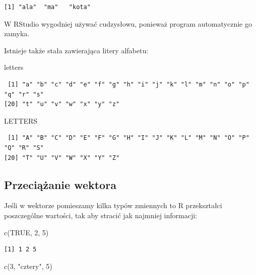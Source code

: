 \documentclass[
  letterpaper,
  DIV=11,
  numbers=noendperiod]{scrreprt}
\newenvironment{Shaded}{\begin{snugshade}}{\end{snugshade}}
\newcommand{\ConstantTok}[1]{\textcolor[rgb]{0.56,0.35,0.01}{#1}}
\newcommand{\DecValTok}[1]{\textcolor[rgb]{0.68,0.00,0.00}{#1}}
\newcommand{\FunctionTok}[1]{\textcolor[rgb]{0.28,0.35,0.67}{#1}}
\newcommand{\NormalTok}[1]{\textcolor[rgb]{0.00,0.23,0.31}{#1}}
\newcommand{\StringTok}[1]{\textcolor[rgb]{0.13,0.47,0.30}{#1}}
\begin{document}
\begin{verbatim}
[1] "ala"  "ma"   "kota"
\end{verbatim}

W RStudio wygodniej używać cudzysłowu, ponieważ program automatycznie go
zamyka.

Istnieje także stała zawierająca litery alfabetu:

\begin{Shaded}
\begin{Highlighting}[]
\NormalTok{letters}
\end{Highlighting}
\end{Shaded}

\begin{verbatim}
 [1] "a" "b" "c" "d" "e" "f" "g" "h" "i" "j" "k" "l" "m" "n" "o" "p" "q" "r" "s"
[20] "t" "u" "v" "w" "x" "y" "z"
\end{verbatim}

\begin{Shaded}
\begin{Highlighting}[]
\NormalTok{LETTERS}
\end{Highlighting}
\end{Shaded}

\begin{verbatim}
 [1] "A" "B" "C" "D" "E" "F" "G" "H" "I" "J" "K" "L" "M" "N" "O" "P" "Q" "R" "S"
[20] "T" "U" "V" "W" "X" "Y" "Z"
\end{verbatim}

\hypertarget{przeciux105ux17canie-wektora}{%
\subsection{Przeciążanie wektora}\label{przeciux105ux17canie-wektora}}

Jeśli w wektorze pomieszamy kilka typów zmiennych to R przekształci
poszczególne wartości, tak aby stracić jak najmniej informacji:

\begin{Shaded}
\begin{Highlighting}[]
\FunctionTok{c}\NormalTok{(}\ConstantTok{TRUE}\NormalTok{, }\DecValTok{2}\NormalTok{, }\DecValTok{5}\NormalTok{)}
\end{Highlighting}
\end{Shaded}

\begin{verbatim}
[1] 1 2 5
\end{verbatim}

\begin{Shaded}
\begin{Highlighting}[]
\FunctionTok{c}\NormalTok{(}\DecValTok{3}\NormalTok{, }\StringTok{"cztery"}\NormalTok{, }\DecValTok{5}\NormalTok{)}
\end{Highlighting}
\end{Shaded}
\end{document}

